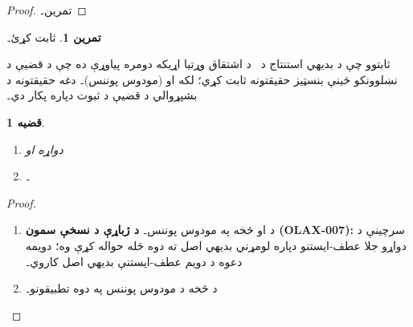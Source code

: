 \documentclass[12pt,a4paper,oneside]{report}
\newcommand{\olfileid}[3]{\gdef\pspart{#1}\gdef\pschapter{#2}\gdef\pssection{#3}}
\gdef\pspart{#2}\gdef\pschapter{#3}\gdef\pssection{}%
\newcommand{\ollabel}[1]{\label{\pspart:\pschapter:\pssection:#1}}
\newtheorem{prop}[thm]{قضيه}
\theoremstyle{definition}
\newtheorem{prob}[thm]{تمرين}
\newenvironment{explain}{}{}
\begin{document}
\label{olpseg:OLP-0121-B016:start}
\begin{proof}
تمرين۔
\end{proof}
\label{olpseg:OLP-0121-B016:end}

\label{olpseg:OLP-0121-B017:start}
\begin{prob}
   ثابت کړئ۔
\end{prob}
\label{olpseg:OLP-0121-B017:end}

\label{olpseg:OLP-0122-B004:start}
\olfileid{fol}{axd}{ppr}
\label{olpseg:OLP-0122-B004:end}

\label{olpseg:OLP-0122-B005:start}
\label{olpseg:OLP-0122-B005:end}

\label{olpseg:OLP-0122-B006:start}
\begin{explain}
  ثابتوو چې د بديهي استنتاج د~\LR{$\Proves$} د اشتقاق وړتيا اړيکه
  دومره پياوړې ده چې د قضيې د نښلوونکو ځينې بنسټيز حقيقتونه ثابت
  کړي؛ لکه  او
   (مودوس پوننس)۔ دغه حقيقتونه د
  بشپړوالي د قضیې د ثبوت دپاره پکار دي۔
\end{explain}
\label{olpseg:OLP-0122-B006:end}

\label{olpseg:OLP-0122-B007:start}
\begin{prop}\ollabel{prop:provability-land}
  \begin{enumerate}
  \item \ollabel{prop:provability-land-left} دواړه
     او 
  \item \ollabel{prop:provability-land-right}
    ۔
  \end{enumerate}
\end{prop}
\label{olpseg:OLP-0122-B007:end}

\label{olpseg:OLP-0122-B008:start}
\begin{proof}
  \begin{enumerate}
    \item د  او  څخه په
      مودوس پوننس۔
      \textbf{د ژباړې د نسخې سمون (OLAX-007):} سرچينې د دواړو
      جلا عطف-ايستنو دپاره لومړني بديهي اصل ته دوه ځله حواله کړې وه؛
      دويمه دعوه د دويم عطف-ايستنې بديهي اصل کاروي۔
  \item د  څخه د مودوس پوننس په دوه تطبيقونو۔
  \end{enumerate}
\end{proof}
\label{olpseg:OLP-0122-B008:end}
\end{document}
